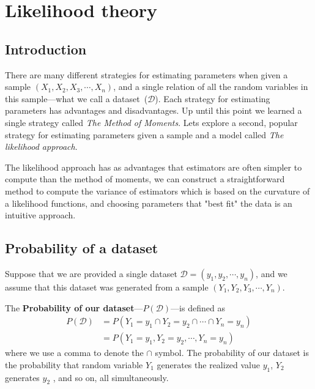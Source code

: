 \chapter{Likelihood theory}
\hspace{1mm}

\section{Introduction}\label{intro}

There are many different strategies for estimating parameters when given a sample $(X_{1},X_{2}, X_{3}, \cdots, X_{n})$, and a single relation of all the random variables in this sample---what we call a dataset~($\mathcal{D}$).
Each strategy for estimating parameters has advantages and disadvantages. 
Up until this point we learned a single strategy called \textit{The Method of Moments}.
Lets explore a second, popular strategy for estimating parameters given a sample and a model called \textit{The likelihood approach}.

The likelihood approach has as advantages that estimators are often simpler to compute than the method of moments, we can construct a straightforward method to compute the variance of estimators which is based on the curvature of a likelihood functions, and choosing parameters that "best fit" the data is an intuitive approach.

\section{Probability of a dataset}

Suppose that we are provided a single dataset $\mathcal{D} = (y_{1},y_{2},\cdots,y_{n})$, and we assume that this dataset was generated from a sample $(Y_{1},Y_{2},Y_{3},\cdots,Y_{n})$.

The \textbf{Probability of our dataset}---$P(\mathcal{D})$---is defined as 
\begin{align}
    P(\mathcal{D}) &= P( Y_{1}=y_{1} \cap Y_{2}=y_{2} \cap \cdots \cap Y_{n}=y_{n} )\\
                   &=P( Y_{1}=y_{1} , Y_{2}=y_{2} , \cdots , Y_{n}=y_{n} )
\end{align}
where we use a comma to denote the $\cap$ symbol.
The probability of our dataset is the probability that random variable $Y_{1}$ generates the realized value $y_{1}$, $Y_{2}$ generates $y_{2}$ , and so on, all simultaneously.


